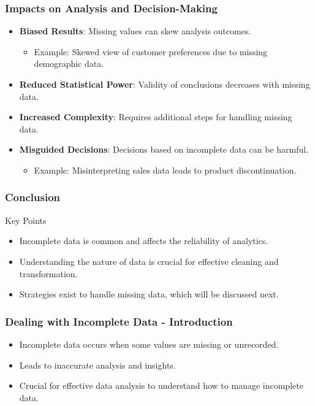 \documentclass[aspectratio=169]{beamer}
\begin{document}
\begin{frame}[fragile]
    \frametitle{Impacts on Analysis and Decision-Making}
    \begin{itemize}
        \item \textbf{Biased Results}: Missing values can skew analysis outcomes.
              \begin{itemize}
                  \item Example: Skewed view of customer preferences due to missing demographic data.
              \end{itemize}
        
        \item \textbf{Reduced Statistical Power}: Validity of conclusions decreases with missing data.
        
        \item \textbf{Increased Complexity}: Requires additional steps for handling missing data.
        
        \item \textbf{Misguided Decisions}: Decisions based on incomplete data can be harmful.
              \begin{itemize}
                  \item Example: Misinterpreting sales data leads to product discontinuation.
              \end{itemize}
    \end{itemize}
\end{frame}

\begin{frame}[fragile]
    \frametitle{Conclusion}
    \begin{block}{Key Points}
        \begin{itemize}
            \item Incomplete data is common and affects the reliability of analytics.
            \item Understanding the nature of data is crucial for effective cleaning and transformation.
            \item Strategies exist to handle missing data, which will be discussed next.
        \end{itemize}
    \end{block}
\end{frame}

\begin{frame}[fragile]
    \frametitle{Dealing with Incomplete Data - Introduction}
    \begin{itemize}
        \item Incomplete data occurs when some values are missing or unrecorded.
        \item Leads to inaccurate analysis and insights.
        \item Crucial for effective data analysis to understand how to manage incomplete data.
    \end{itemize}
\end{frame}
\end{document}
